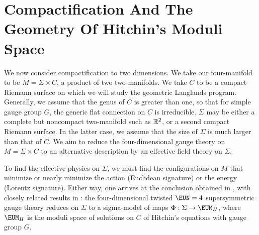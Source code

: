 
\section{Compactification And The Geometry Of Hitchin's Moduli Space}
\def\MH{{\EUM}_H}

\label{sec:compacthitchin}

We now consider compactification to two dimensions.  We take our
four-manifold to be $M=\Sigma\times C$, a product of two
two-manifolds.  We take $C$ to be a compact Riemann surface on
which we will study the geometric Langlands program.  Generally,
we assume that the genus of $C$ is greater than one, so that for
simple gauge group $G$, the generic flat connection on $C$ is
irreducible. $\Sigma$ may be either a complete but noncompact
two-manifold such as $\Bbb{R}^2$, or a second compact Riemann
surface.   In the latter case, we assume that the size of $\Sigma$
is much larger than that of $C$. We aim to reduce the
four-dimensional gauge theory on $M=\Sigma\times C$ to an
alternative description by an effective field theory on $\Sigma$.

To find the effective physics on $\Sigma$, we must find the
configurations on $M$ that minimize or nearly minimize the action
(Euclidean signature) or the energy (Lorentz signature).  Either
way, one arrives at the conclusion obtained in \cite{ref18}, with closely
related results in \cite{ref19}: the four-dimensional twisted ${\EUN}=4$
supersymmetric gauge theory reduces on $\Sigma$ to a sigma-model
of maps $\Phi:\Sigma\to\MH$, where $\MH$ is the moduli space of
solutions on $C$ of Hitchin's equations  with gauge group $G$.


